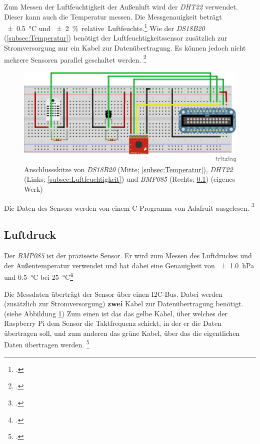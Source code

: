 Zum Messen der Luftfeuchtigkeit der Außenluft wird der \emph{DHT22} verwendet. Dieser kann auch die Temperatur messen. Die Messgenauigkeit beträgt \SI{\pm 0.5}{\degreeCelsius} und \SI{\pm 2}{\% .relative.Luftfeuchte}.\footcite{DHT22}
Wie der \emph{DS18B20} (\ref{subsec:Temperatur}) benötigt der Luftfeuchtigkeitssensor zusätzlich zur Stromversorgung nur ein Kabel zur Datenübertragung. Es können jedoch nicht mehrere Sensoren parallel geschaltet werden. \footcite[Wiring]{DHT}

\begin{figure}
  \centering
     \includegraphics[width=\textwidth]{figures/steckbrett.png}
  \caption{Anschlussskitze von \emph{DS18B20} (Mitte; \ref{subsec:Temperatur}), \emph{DHT22} (Links; \ref{subsec:Luftfeuchtigkeit}) und \emph{BMP085} (Rechts; \ref{subsec:Luftdruck}) (eigenes Werk)}
  \label{fig:steckbrett}
\end{figure}

Die Daten des Sensors werden von einem \gls{C}-Programm von Adafruit ausgelesen.
\footcite[Software Install]{DHT}

\subsection{Luftdruck}
\label{subsec:Luftdruck}

Der \emph{BMP085} ist der präziseste Sensor. Er wird zum Messen des Luftdruckes und der Außentemperatur verwendet und hat dabei eine Genauigkeit von \SI{\pm 1.0}{\hecto\pascal} und \SI{0.5}{\degreeCelsius} bei \SI{25}{\degreeCelsius}\footcite[6]{BMP085}

Die Messdaten überträgt der Sensor über einen \gls{I2C}-Bus. Dabei werden (zusätzlich zur Stromversorgung) \textbf{zwei} Kabel zur Datenübertragung benötigt. (siehe Abbildung \ref{fig:steckbrett})
Zum einen ist das das gelbe Kabel, über welches der Raspberry Pi dem Sensor die Taktfrequenz schickt, in der er die Daten übertragen soll, und zum anderen das grüne Kabel, über das die eigentlichen Daten übertragen werden.
\footcite[Hooking Everything Up]{bmp058_adafruit}

